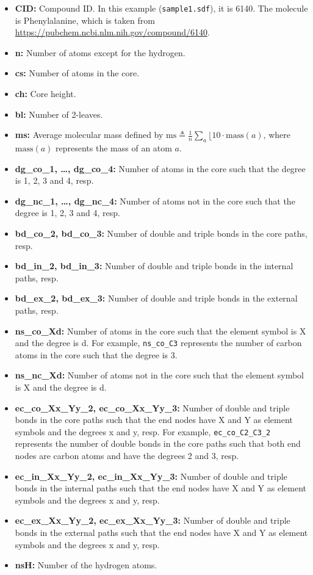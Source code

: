 \documentclass[11pt, titlepage, dvipdfmx, twoside]{article}
\begin{document}
\begin{itemize}
\item {\bf CID:} Compound ID. In this example ({\tt sample1.sdf}), it is 6140. The molecule is Phenylalanine, which is taken from \url{https://pubchem.ncbi.nlm.nih.gov/compound/6140}.
\item {\bf n:}  Number of atoms except for the hydrogen.
\item {\bf cs:} Number of atoms in the core.
\item {\bf ch:} Core height.
\item {\bf bl:} Number of 2-leaves.
\item {\bf ms:} Average molecular mass defined by $\textrm{ms}\triangleq\frac{1}{n}\sum_{a}\lfloor 10 \cdot \textrm{mass}(a)$, where $\textrm{mass}(a)$ represents the mass of an atom $a$.
\item {\bf dg\_co\_1, \dots, dg\_co\_4:} Number of atoms in the core such that the degree is 1, 2, 3 and 4, resp.
\item {\bf dg\_nc\_1, \dots, dg\_nc\_4:} Number of atoms not in the core such that the degree is 1, 2, 3 and 4, resp.
\item {\bf bd\_co\_2, bd\_co\_3:} Number of double and triple bonds in the core paths, resp.
\item {\bf bd\_in\_2, bd\_in\_3:} Number of double and triple bonds in the internal paths, resp.
\item {\bf bd\_ex\_2, bd\_ex\_3:} Number of double and triple bonds in the external paths, resp.
\item {\bf ns\_co\_Xd:} Number of atoms in the core such that the element symbol is X and the degree is d. For example, {\tt ns\_co\_C3} represents the number of carbon atoms in the core such that the degree is 3. 
\item {\bf ns\_nc\_Xd:} Number of atoms not in the core such that the element symbol is X and the degree is d.
\item {\bf ec\_co\_Xx\_Yy\_2, ec\_co\_Xx\_Yy\_3:} Number of double and triple bonds in the core paths such that the end nodes have X and Y as element symbols and the degrees x and y, resp. For example, {\tt ec\_co\_C2\_C3\_2} represents the number of double bonds in the core paths such that both end nodes are carbon atoms and have the degrees 2 and 3, resp. 
\item {\bf ec\_in\_Xx\_Yy\_2, ec\_in\_Xx\_Yy\_3:}
  Number of double and triple bonds in the internal paths such that the end nodes have X and Y as element symbols and the degrees x and y, resp.
\item {\bf ec\_ex\_Xx\_Yy\_2, ec\_ex\_Xx\_Yy\_3:}
  Number of double and triple bonds in the external paths such that the end nodes have X and Y as element symbols and the degrees x and y, resp.
\item {\bf nsH:} Number of the hydrogen atoms. 
\end{itemize}
\end{document}
